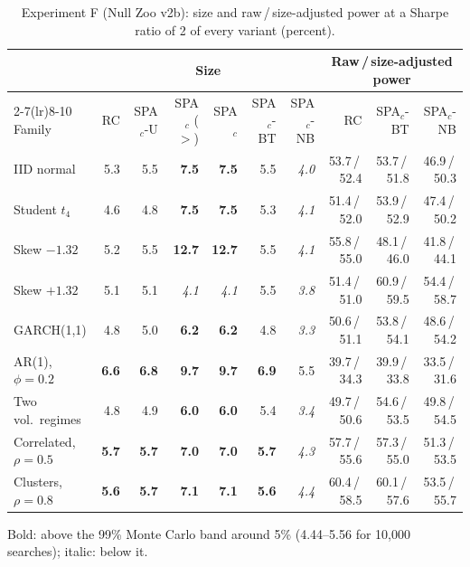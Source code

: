 \begin{table}[t]
\centering
\footnotesize
\setlength{\tabcolsep}{3.5pt}
\caption{Experiment F (Null Zoo v2b): size and raw\,/\,size-adjusted power at a Sharpe ratio of 2 of every variant (percent).}
\label{tab:block-student-power}
\begin{tabular}{lrrrrrrrrr}
\toprule
 & \multicolumn{6}{c}{Size} & \multicolumn{3}{c}{Raw\,/\,size-adjusted power} \\
\cmidrule(lr){2-7}\cmidrule(lr){8-10}
Family & RC & SPA$_c$-U & SPA$_c$ ($>$) & SPA$_c$ & SPA$_c$-BT & SPA$_c$-NB & RC & SPA$_c$-BT & SPA$_c$-NB \\
\midrule
IID normal & 5.3 & 5.5 & \textbf{7.5} & \textbf{7.5} & 5.5 & \textit{4.0} & 53.7\,/\,52.4 & 53.7\,/\,51.8 & 46.9\,/\,50.3 \\
Student $t_4$ & 4.6 & 4.8 & \textbf{7.5} & \textbf{7.5} & 5.3 & \textit{4.1} & 51.4\,/\,52.0 & 53.9\,/\,52.9 & 47.4\,/\,50.2 \\
Skew $-1.32$ & 5.2 & 5.5 & \textbf{12.7} & \textbf{12.7} & 5.5 & \textit{4.1} & 55.8\,/\,55.0 & 48.1\,/\,46.0 & 41.8\,/\,44.1 \\
Skew $+1.32$ & 5.1 & 5.1 & \textit{4.1} & \textit{4.1} & 5.5 & \textit{3.8} & 51.4\,/\,51.0 & 60.9\,/\,59.5 & 54.4\,/\,58.7 \\
GARCH(1,1) & 4.8 & 5.0 & \textbf{6.2} & \textbf{6.2} & 4.8 & \textit{3.3} & 50.6\,/\,51.1 & 53.8\,/\,54.1 & 48.6\,/\,54.2 \\
AR(1), $\phi=0.2$ & \textbf{6.6} & \textbf{6.8} & \textbf{9.7} & \textbf{9.7} & \textbf{6.9} & 5.5 & 39.7\,/\,34.3 & 39.9\,/\,33.8 & 33.5\,/\,31.6 \\
Two vol.\ regimes & 4.8 & 4.9 & \textbf{6.0} & \textbf{6.0} & 5.4 & \textit{3.4} & 49.7\,/\,50.6 & 54.6\,/\,53.5 & 49.8\,/\,54.5 \\
Correlated, $\rho=0.5$ & \textbf{5.7} & \textbf{5.7} & \textbf{7.0} & \textbf{7.0} & \textbf{5.7} & \textit{4.3} & 57.7\,/\,55.6 & 57.3\,/\,55.0 & 51.3\,/\,53.5 \\
Clusters, $\rho=0.8$ & \textbf{5.6} & \textbf{5.7} & \textbf{7.1} & \textbf{7.1} & \textbf{5.6} & \textit{4.4} & 60.4\,/\,58.5 & 60.1\,/\,57.6 & 53.5\,/\,55.7 \\
\bottomrule
\end{tabular}
\par\smallskip\begin{minipage}{0.97\linewidth}\footnotesize Bold: above the 99\% Monte Carlo band around 5\% (4.44--5.56 for 10{,}000 searches); italic: below it.\end{minipage}
\end{table}

